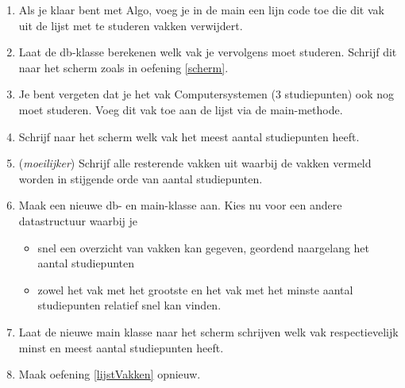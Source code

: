\begin{enumerate}
\item Als je klaar bent met Algo, voeg je in de main een lijn code toe die dit vak uit de lijst met te studeren vakken verwijdert. 
\item Laat de db-klasse berekenen welk vak je vervolgens moet studeren. Schrijf dit naar het scherm zoals in oefening \ref{scherm}. 
\item Je bent vergeten dat je het vak Computersystemen (3 studiepunten) ook nog moet studeren. Voeg dit vak toe aan de lijst via de main-methode. 
\item Schrijf naar het scherm welk vak het meest aantal studiepunten heeft. 
\item ({\em moeilijker}) \label{lijstVakken} Schrijf alle resterende vakken uit waarbij de vakken vermeld worden in stijgende orde van aantal studiepunten. 
\item Maak een nieuwe db- en main-klasse aan. Kies nu voor een andere datastructuur waarbij je
\begin{itemize}
\item snel een overzicht van vakken kan gegeven, geordend naargelang het aantal studiepunten
\item zowel het vak met het grootste en het vak met het minste aantal studiepunten relatief snel kan vinden.
\end{itemize}
\item Laat de nieuwe main klasse naar het scherm schrijven welk vak respectievelijk minst en meest aantal studiepunten heeft.
\item Maak oefening \ref{lijstVakken} opnieuw. 
\end{enumerate}


